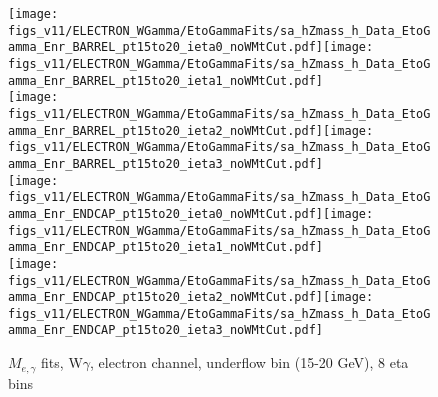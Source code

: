 \begin{figure}[htb]
  \begin{center}
   \texttt{[image: figs\_v11/ELECTRON\_WGamma/EtoGammaFits/sa\_hZmass\_h\_Data\_EtoGamma\_Enr\_BARREL\_pt15to20\_ieta0\_noWMtCut.pdf]}\texttt{[image: figs\_v11/ELECTRON\_WGamma/EtoGammaFits/sa\_hZmass\_h\_Data\_EtoGamma\_Enr\_BARREL\_pt15to20\_ieta1\_noWMtCut.pdf]}\\
   \texttt{[image: figs\_v11/ELECTRON\_WGamma/EtoGammaFits/sa\_hZmass\_h\_Data\_EtoGamma\_Enr\_BARREL\_pt15to20\_ieta2\_noWMtCut.pdf]}\texttt{[image: figs\_v11/ELECTRON\_WGamma/EtoGammaFits/sa\_hZmass\_h\_Data\_EtoGamma\_Enr\_BARREL\_pt15to20\_ieta3\_noWMtCut.pdf]}\\
   \texttt{[image: figs\_v11/ELECTRON\_WGamma/EtoGammaFits/sa\_hZmass\_h\_Data\_EtoGamma\_Enr\_ENDCAP\_pt15to20\_ieta0\_noWMtCut.pdf]}\texttt{[image: figs\_v11/ELECTRON\_WGamma/EtoGammaFits/sa\_hZmass\_h\_Data\_EtoGamma\_Enr\_ENDCAP\_pt15to20\_ieta1\_noWMtCut.pdf]}\\
   \texttt{[image: figs\_v11/ELECTRON\_WGamma/EtoGammaFits/sa\_hZmass\_h\_Data\_EtoGamma\_Enr\_ENDCAP\_pt15to20\_ieta2\_noWMtCut.pdf]}\texttt{[image: figs\_v11/ELECTRON\_WGamma/EtoGammaFits/sa\_hZmass\_h\_Data\_EtoGamma\_Enr\_ENDCAP\_pt15to20\_ieta3\_noWMtCut.pdf]}\\
  \label{fig:etogFits_15to20}
  \caption{$M_{e,\gamma}$ fits, W$\gamma$, electron channel, underflow bin (15-20 GeV), 8 eta bins}
  \end{center}
\end{figure}


